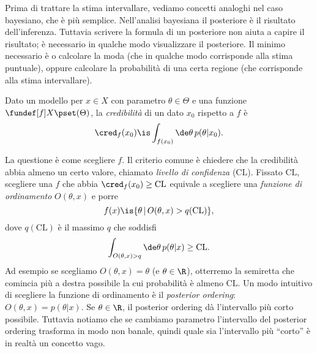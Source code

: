 Prima di trattare la stima intervallare,
vediamo concetti analoghi nel caso bayesiano,
che è più semplice.
Nell'analisi bayesiana il posteriore è il risultato dell'inferenza.
Tuttavia scrivere la formula di un posteriore non aiuta a capire il risultato;
è necessario in qualche modo visualizzare il posteriore.
Il minimo necessario è o calcolare la moda
(che in qualche modo corrisponde alla stima puntuale),
oppure calcolare la probabilità di una certa regione (che corrisponde alla stima intervallare).
\begin{definition}[Credibilità]
	\label{th:cred}
	Dato un modello per $x\in X$ con parametro $\theta\in\Theta$
	e una funzione $\fundef[f]X\pset(\Theta)$,
	la \emph{credibilità} di un dato $x_0$ rispetto a $f$ è
	\begin{equation*}
		\cred_f(x_0)
		\is \int_{f(x_0)} \de \theta\, p(\theta|x_0).
	\end{equation*}
\end{definition}
La questione è come scegliere $f$.
Il criterio comune è chiedere che la credibilità abbia almeno un certo valore,
chiamato \emph{livello di confidenza} ($\mathrm{CL}$).
Fissato $\mathrm{CL}$, scegliere una $f$ che abbia $\cred_f(x_0)\ge\mathrm{CL}$
equivale a scegliere una \emph{funzione di ordinamento} $O(\theta,x)$ e porre
\begin{equation*}
	f(x) \is \{\theta\,|\,O(\theta,x)>q(\mathrm{CL})\},
\end{equation*}
dove $q(\mathrm{CL})$ è il massimo $q$ che soddisfi
\begin{equation*}
	\int_{O(\theta,x)>q} \de\theta\, p(\theta|x) \ge \mathrm{CL}.
\end{equation*}
Ad esempio se scegliamo $O(\theta,x)=\theta$ (e $\theta\in\R$),
otterremo la semiretta che comincia più a destra possibile la cui probabilità è almeno $\mathrm{CL}$.
Un modo intuitivo di scegliere la funzione di ordinamento è il \emph{posterior ordering}:
$O(\theta,x) = p(\theta|x)$.
Se $\theta\in\R$, il posterior ordering dà l'intervallo più corto possibile.
Tuttavia notiamo che se cambiamo parametro l'intervallo del posterior ordering trasforma in modo non banale,
quindi quale sia l'intervallo più ``corto'' è in realtà un concetto vago.


